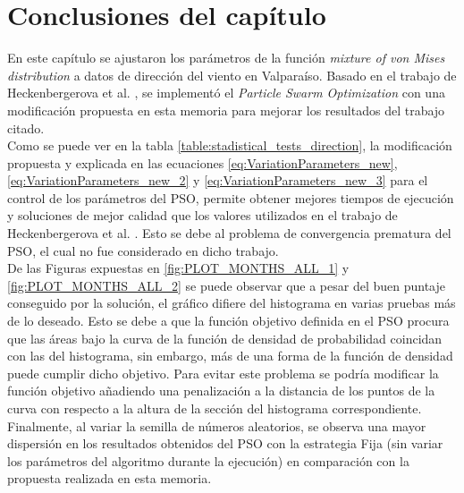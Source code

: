 \section{Conclusiones del capítulo}
En este capítulo se ajustaron los parámetros de la función \emph{mixture of von Mises distribution} a datos de dirección del viento en Valparaíso. Basado en el trabajo de Heckenbergerova et al. \cite{Heckenbergerova15}, se implementó el \emph{Particle Swarm Optimization} con una modificación propuesta en esta memoria para mejorar los resultados del trabajo citado.\\
Como se puede ver en la tabla \ref{table:stadistical_tests_direction}, la modificación propuesta y explicada en las ecuaciones \ref{eq:VariationParameters_new}, \ref{eq:VariationParameters_new_2} y \ref{eq:VariationParameters_new_3} para el control de los parámetros del PSO, permite obtener mejores tiempos de ejecución y soluciones de mejor calidad que los valores utilizados en el trabajo de Heckenbergerova et al. \cite{Heckenbergerova15}. Esto se debe al problema de convergencia prematura del PSO, el cual no fue considerado en dicho trabajo. \\
De las Figuras expuestas en \ref{fig:PLOT_MONTHS_ALL_1} y \ref{fig:PLOT_MONTHS_ALL_2} se puede observar que a pesar del buen puntaje conseguido por la solución, el gráfico difiere del histograma en varias pruebas más de lo deseado. Esto se debe a que la función objetivo definida en el PSO procura que las áreas bajo la curva de la función de densidad de probabilidad coincidan con las del histograma, sin embargo, más de una forma de la función de densidad puede cumplir dicho objetivo. Para evitar este problema se podría modificar la función objetivo añadiendo una penalización a la distancia de los puntos de la curva con respecto a la altura de la sección del histograma correspondiente.\\
Finalmente, al variar la semilla de números aleatorios, se observa una mayor dispersión en los resultados obtenidos del PSO con la estrategia Fija (sin variar los parámetros del algoritmo durante la ejecución) en comparación con la propuesta realizada en esta memoria.